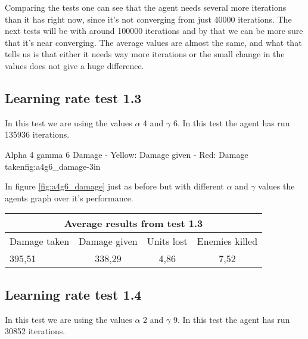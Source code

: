 Comparing the tests one can see that the agent needs several more iterations than it has right now, since it's not converging from just 40000 iterations. The next tests will be with around 100000 iterations and by that we can be more sure that it's near converging. The average values are almost the same, and what that tells us is that either it needs way more iterations or the small change in the values does not give a huge difference.




\subsection*{Learning rate test 1.3}
In this test we are using the values $\alpha$ 4 and $\gamma$ 6. In this test the agent has run 135936 iterations.


			{Alpha 4 gamma 6 Damage - Yellow: Damage given - Red: Damage taken}{fig:a4g6_damage}{-3in}

In figure \ref{fig:a4g6_damage} just as before but with different $\alpha$ and $\gamma$ values the agents graph over it's performance.




\begin{centering}
 \begin{tabular}{|l||c|c|c|}
	\multicolumn{4}{c}{Average results from test 1.3} \\
	\hline
		Damage taken & Damage given & Units lost & Enemies killed\\
	\hline
		395,51 & 338,29 & 4,86 & 7,52 \\
	\hline

\end{tabular}
\end{centering}




\subsection*{Learning rate test 1.4}
In this test we are using the values $\alpha$ 2 and $\gamma$ 9. In this test the agent has run 30852 iterations.


